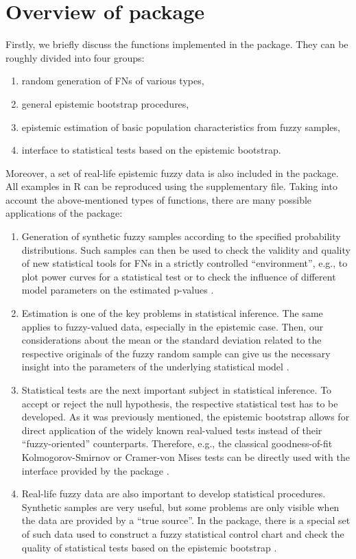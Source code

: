 \section{Overview of  package}
\label{overview}
Firstly, we briefly discuss the functions implemented in the  package.
They can be roughly divided into four groups:
\begin{enumerate}
\item random generation of FNs of various types,
\item general epistemic bootstrap procedures,
\item epistemic estimation of basic population characteristics from fuzzy samples,
\item interface to statistical tests based on the epistemic bootstrap.
\end{enumerate}
Moreover, a set of real-life epistemic fuzzy data is also included in the package.
All examples in R can be reproduced using the supplementary file.
Taking into account the above-mentioned types of functions, there are many possible applications of the  package:
\begin{enumerate}
	\item Generation of synthetic fuzzy samples according to the specified probability distributions.
	Such samples can then be used to check the validity and quality of new statistical tools for FNs in a strictly controlled ``environment'', e.g., to plot power curves for a statistical test \citep{pgmr2022} or to check the influence of different model parameters on the estimated p-values \citep{PGMR2024AMS}.
	\item Estimation is one of the key problems in statistical inference.
	The same applies to fuzzy-valued data, especially in the epistemic case.
	Then, our considerations about the mean or the standard deviation related to the respective originals of the fuzzy random sample can give us the necessary insight into the parameters of the underlying statistical model \citep{grzegorzewski2021,pgmr2022}.
	\item Statistical tests are the next important subject in statistical inference.
	To accept or reject the null hypothesis, the respective statistical test has to be developed.
	As it was previously mentioned, the epistemic bootstrap allows for direct application of the widely known real-valued tests instead of their ``fuzzy-oriented'' counterparts.
	Therefore, e.g., the classical goodness-of-fit Kolmogorov-Smirnov or Cramer-von Mises tests can be directly used with the interface provided by the  package \citep{10.1007/978-3-031-08974-9_39,PGMR2024AMS}.
	\item Real-life fuzzy data are also important to develop statistical procedures.
	Synthetic samples are very useful, but some problems are only visible when the data are provided by a ``true source''.
	In the  package, there is a special set of such data used to construct a fuzzy statistical control chart \citep{FARAZ20102684} and check the quality of statistical tests based on the epistemic bootstrap \citep{PGMR2024AMS}.
\end{enumerate}
